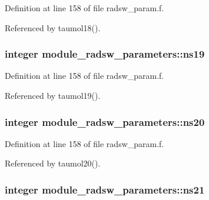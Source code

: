 Definition at line 158 of file radsw\+\_\+param.\+f.



Referenced by taumol18().

\subsubsection[{\texorpdfstring{ns19}{ns19}}]{\setlength{\rightskip}{0pt plus 5cm}integer module\+\_\+radsw\+\_\+parameters\+::ns19}\hypertarget{namespacemodule__radsw__parameters_ab666e8da69b308ae5b09e187b8153518}{}\label{namespacemodule__radsw__parameters_ab666e8da69b308ae5b09e187b8153518}


Definition at line 158 of file radsw\+\_\+param.\+f.



Referenced by taumol19().

\subsubsection[{\texorpdfstring{ns20}{ns20}}]{\setlength{\rightskip}{0pt plus 5cm}integer module\+\_\+radsw\+\_\+parameters\+::ns20}\hypertarget{namespacemodule__radsw__parameters_ad63ddbb0abcaeda56220a624a62a7336}{}\label{namespacemodule__radsw__parameters_ad63ddbb0abcaeda56220a624a62a7336}


Definition at line 158 of file radsw\+\_\+param.\+f.



Referenced by taumol20().

\subsubsection[{\texorpdfstring{ns21}{ns21}}]{\setlength{\rightskip}{0pt plus 5cm}integer module\+\_\+radsw\+\_\+parameters\+::ns21}\hypertarget{namespacemodule__radsw__parameters_a63b1d13965acda2c131123f67fe456ea}{}\label{namespacemodule__radsw__parameters_a63b1d13965acda2c131123f67fe456ea}


